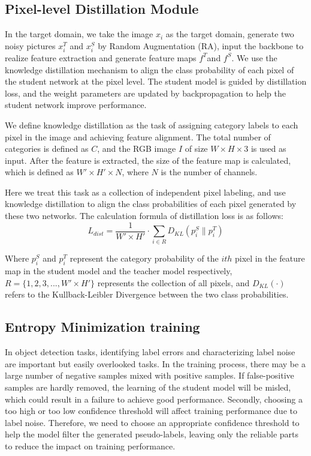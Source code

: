 \documentclass[sn-mathphys]{sn-jnl}%
\theoremstyle{thmstyleone}%
\theoremstyle{thmstyletwo}%
\theoremstyle{thmstylethree}%
\begin{document}
\subsection{Pixel-level Distillation Module}\label{sec:sec3.1}

In the target domain, we take the image ${{x}_{i}}$ as the target domain, generate two noisy pictures $x_{i}^{T}$ and $x_{i}^{S}$ by Random Augmentation (RA), input the backbone to realize feature extraction and generate feature maps ${{f}^{T}}$and ${{f}^{S}}$. We use the knowledge distillation mechanism to align the class probability of each pixel of the student network at the pixel level. The student model is guided by distillation loss, and the weight parameters are updated by backpropagation to help the student network improve performance.

We define knowledge distillation as the task of assigning category labels to each pixel in the image and achieving feature alignment. The total number of categories is defined as $C$, and the RGB image $I$ of size $W\times H\times 3$ is used as input. After the feature is extracted, the size of the feature map is calculated, which is defined as $W'\times H'\times N$, where $N$ is the number of channels.

Here we treat this task as a collection of independent pixel labeling, and use knowledge distillation to align the class probabilities of each pixel generated by these two networks. The calculation formula of distillation loss is as follows:
\begin{equation}
{{L}_{dist}}=\frac{1}{W'\times H'}\cdot \sum\limits_{i\in R}{{{D}_{KL}}\left( p_{i}^{S}\parallel p_{i}^{T} \right)}
\label{eq:01}
\end{equation}

Where $p_{i}^{S}$ and $p_{i}^{T}$ represent the category probability of the $ith$ pixel in the feature map in the student model and the teacher model respectively, $R=\{1,2,3,...,{W}'\times {H}'\}$ represents the collection of all pixels, and ${{D}_{KL}}\left( \cdot\right)$ refers to the Kullback-Leibler Divergence between the two class probabilities.

\subsection{Entropy Minimization training}\label{sec:sec3.2}

In object detection tasks, identifying label errors and characterizing label noise are important but easily overlooked tasks. In the training process, there may be a large number of negative samples mixed with positive samples. If false-positive samples are hardly removed, the learning of the student model will be misled, which could result in a failure to achieve good performance. Secondly, choosing a too high or too low confidence threshold will affect training performance due to label noise. Therefore, we need to choose an appropriate confidence threshold to help the model filter the generated pseudo-labels, leaving only the reliable parts to reduce the impact on training performance.
\end{document}
